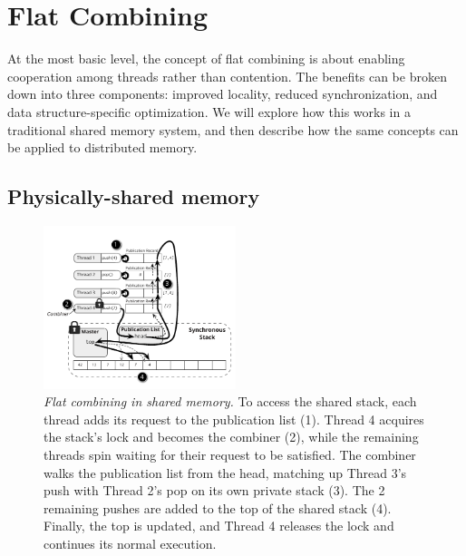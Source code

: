 \section{Flat Combining}

At the most basic level, the concept of flat combining is about enabling cooperation among threads rather than contention. The benefits can be broken down into three components: improved locality, reduced synchronization, and data structure-specific optimization. We will explore how this works in a traditional shared memory system, and then describe how the same concepts can be applied to distributed memory.


\subsection{Physically-shared memory}

\begin{figure}[ht]
  \centering
  \includegraphics[width=0.5\textwidth]{figs/fc_shared_mem.pdf}
  \caption{\emph{Flat combining in shared memory.}
    To access the shared stack, each thread adds its request to the publication list (1). Thread 4 acquires the stack's lock and becomes the combiner (2), while the remaining threads spin waiting for their request to be satisfied. The combiner walks the publication list from the head, matching up Thread 3's push with Thread 2's pop on its own private stack (3). The 2 remaining pushes are added to the top of the shared stack (4). Finally, the top is updated, and Thread 4 releases the lock and continues its normal execution.
  }
  \label{fig:fc_shared_mem}
\end{figure}

